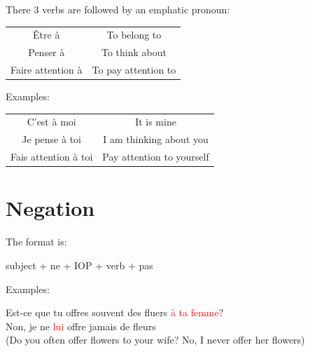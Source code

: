 \documentclass{book}
\begin{document}
    There 3 verbs are followed by an emphatic pronoun:
        \begin{center}
            \begin{tabular}{|c|c|}
                \hline
                Être à & To belong to \\
                Penser à & To think about \\
                Faire attention à & To pay attention to \\
                \hline
            \end{tabular}
        \end{center}
    Examples:
        \begin{center}
            \begin{tabular}{|c|c|}
                \hline
                C'est à moi & It is mine \\
                Je pense à toi & I am thinking about you \\
                Fais attention à toi & Pay attention to yourself \\
                \hline
            \end{tabular}
        \end{center}

    \section{Negation}
        The format is:
            \begin{center}
                subject + ne + IOP + verb + pas
            \end{center}
        Examples:
            \begin{center}
                Est-ce que tu offres souvent des fluers \textcolor{red}{à ta femme}? \\
                Non, je ne \textcolor{red}{lui} offre jamais de fleurs \\
                (Do you often offer flowers to your wife? No, I never offer her flowers)
            \end{center}
\end{document}
